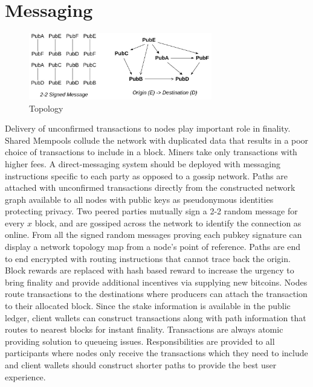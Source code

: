 \documentclass[a4paper,10pt]{article}
\begin{document}
\section{Messaging}
\begin{figure}[H]
\begin{center}
\includegraphics[width=8cm]{topology}
\caption{Topology}
\end{center}
\end{figure}
Delivery of unconfirmed transactions to nodes play important role in finality. Shared Mempools collude the network with duplicated data that results in a poor choice of transactions to include in a block. Miners take only transactions with higher fees. A direct-messaging system should be deployed with messaging instructions specific to each party as opposed to a gossip network. Paths are attached with unconfirmed transactions directly from the constructed network graph available to all nodes with public keys as pseudonymous identities protecting privacy. Two peered parties mutually sign a 2-2 random message for every $x$ block, and are gossiped across the network to identify the connection as online. From all the signed random messages proving each pubkey signature can display a network topology map from a node's point of reference. Paths are end to end encrypted with routing instructions that cannot trace back the origin. Block rewards are replaced with hash based reward to increase the urgency to bring finality and provide additional incentives via supplying new bitcoins. Nodes route transactions to the destinations where producers can attach the transaction to their allocated block. Since the stake information is available in the public ledger, client wallets can construct transactions along with path information that routes to nearest blocks for instant finality. Transactions are always atomic providing solution to queueing issues. Responsibilities are provided to all participants where nodes only receive the transactions which they need to include and client wallets should construct shorter paths to provide the best user experience.
\end{document}
